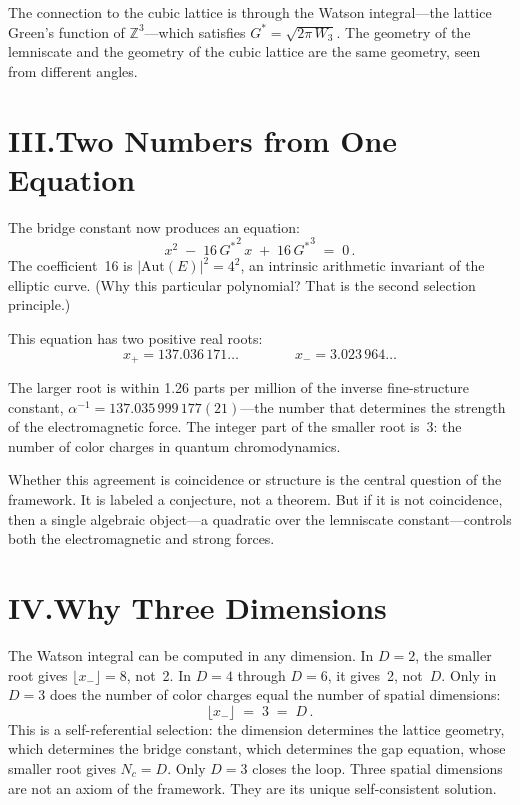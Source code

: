 \documentclass[11pt,a4paper]{article}
\newcommand{\Gstar}{{G^{*}}}
\begin{document}
The connection to the cubic lattice is through the Watson integral---the lattice Green's function of $\mathbb{Z}^3$---which satisfies $\Gstar = \sqrt{2\pi\,W_3}$. The geometry of the lemniscate and the geometry of the cubic lattice are the same geometry, seen from different angles.

\section*{III.\quad Two Numbers from One Equation}

The bridge constant now produces an equation:
\[
x^2 \;-\; 16\,\Gstar^2\, x \;+\; 16\,\Gstar^3 \;=\; 0\,.
\]
The coefficient~16 is $|\mathrm{Aut}(E)|^2 = 4^2$, an intrinsic arithmetic invariant of the elliptic curve. (Why this particular polynomial? That is the second selection principle.)

This equation has two positive real roots:
\[
x_+ = 137.036\,171\ldots \qquad\qquad x_- = 3.023\,964\ldots
\]

The larger root is within 1.26 parts per million of the inverse fine-structure constant, $\alpha^{-1} = 137.035\,999\,177(21)$---the number that determines the strength of the electromagnetic force. The integer part of the smaller root is~3: the number of color charges in quantum chromodynamics.

Whether this agreement is coincidence or structure is the central question of the framework. It is labeled a conjecture, not a theorem. But if it is not coincidence, then a single algebraic object---a quadratic over the lemniscate constant---controls both the electromagnetic and strong forces.

\section*{IV.\quad Why Three Dimensions}

The Watson integral can be computed in any dimension. In $D = 2$, the smaller root gives $\lfloor x_- \rfloor = 8$, not~2. In $D = 4$ through $D = 6$, it gives~2, not~$D$. Only in $D = 3$ does the number of color charges equal the number of spatial dimensions:
\[
\lfloor x_- \rfloor \;=\; 3 \;=\; D\,.
\]
This is a self-referential selection: the dimension determines the lattice geometry, which determines the bridge constant, which determines the gap equation, whose smaller root gives $N_c = D$. Only $D = 3$ closes the loop. Three spatial dimensions are not an axiom of the framework. They are its unique self-consistent solution.
\end{document}
